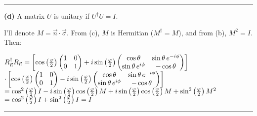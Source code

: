 \documentclass[14pt]{extarticle}
\makeatletter
\newenvironment{lefteqs}{%
    \begin{flushleft}%
    \renewcommand{\arraystretch}{1.3}%
    $\begin{array}{@{}l@{}}%
}{%
    \end{array}$%
    \end{flushleft}%
}
\makeatother
\begin{document}
\hrule
\vspace{2em}

\textbf{(d)} \quad A matrix $U$ is unitary if $U^\dagger U = I$.

I'll denote $M = \vec{n} \cdot \vec{\sigma}$. From (c), $M$ is Hermitian ($M^\dagger = M$), and from (b), $M^2 = I$. Then:
\begin{lefteqs}
    R_{\vec{n}}^\dagger R_{\vec{n}} =
    \left[ \cos\left(\frac{\varphi}{2}\right) \begin{pmatrix} 1 & 0 \\ 0 & 1 \end{pmatrix}
    + i \sin\left(\frac{\varphi}{2}\right) \begin{pmatrix} \cos\theta & \sin\theta \, e^{-i\phi} \\ \sin\theta \, e^{i\phi} & -\cos\theta \end{pmatrix} \right] \\
    \cdot \left[ \cos\left(\frac{\varphi}{2}\right) \begin{pmatrix} 1 & 0 \\ 0 & 1 \end{pmatrix}
    - i \sin\left(\frac{\varphi}{2}\right) \begin{pmatrix} \cos\theta & \sin\theta \, e^{-i\phi} \\ \sin\theta \, e^{i\phi} & -\cos\theta \end{pmatrix} \right] \\
    = \cos^2\left(\frac{\varphi}{2}\right) I
    - i \sin\left(\frac{\varphi}{2}\right)\cos\left(\frac{\varphi}{2}\right) M
    + i \sin\left(\frac{\varphi}{2}\right)\cos\left(\frac{\varphi}{2}\right) M
    + \sin^2\left(\frac{\varphi}{2}\right) M^2 \\
    = \cos^2\left(\frac{\varphi}{2}\right) I + \sin^2\left(\frac{\varphi}{2}\right) I = I
\end{lefteqs}

\hrule
\vspace{2em}
\end{document}
